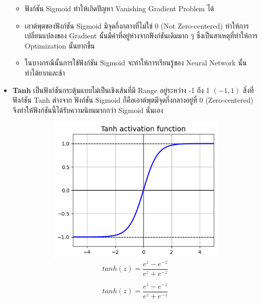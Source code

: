 \begin{itemize}
\begin{itemize}
              \item ฟังก์ชัน Sigmoid ทำให้เกิดปัญหา Vanishing Gradient Problem ได้

              \item เอาต์พุตของฟังก์ชัน Sigmoid มีจุดกึ่งกลางที่ไม่ใช่ 0 (Not Zero-centered) ทำให้การเปลี่ยนแปลงของ Gradient
                    นั้นมีค่าที่อยู่ห่างจากฟังก์ชันเดิมมาก ๆ ซึ่งเป็นสาเหตุที่ทำให้การ Optimization นั้นยากขึ้น

              \item ในบางกรณีนั้นการใช้ฟังก์ชัน Sigmoid จะทำให้การเรียนรู้ของ Neural Network นั้นทำได้ยากและช้า
          \end{itemize}

    \item \textbf{Tanh} เป็นฟังก์ชันกระตุ้นแบบไม่เป็นเชิงเส้นที่มี Range อยู่ระหว่าง -1 ถึง 1 $(-1, 1)$ สิ่งที่ฟังก์ชัน Tanh ต่างจาก%
          ฟังก์ชัน Sigmoid ก็คือเอาต์พุตมีจุดกึ่งกลางอยู่ที่ 0 (Zero-centered) จึงทำให้ฟังก์ชันนี้ได้รับความนิยมมากกว่า Sigmoid นั่นเอง
          \begin{figure}[H]
              \centering
              \begin{subfigure}{0.5\textwidth}
                  \centering
                  \includegraphics[width=0.9\linewidth]{fig/actfunc_tanh.png}
                  \caption{%
                      \begin{equation}
                          tanh(z) = \frac{e^{z} - e^{-z}}{e^{z} + e^{-z}}
                      \end{equation}
                  }
                  \label{fig:actfunc_tanh}

\end{subfigure}
\end{figure}
\end{itemize}
